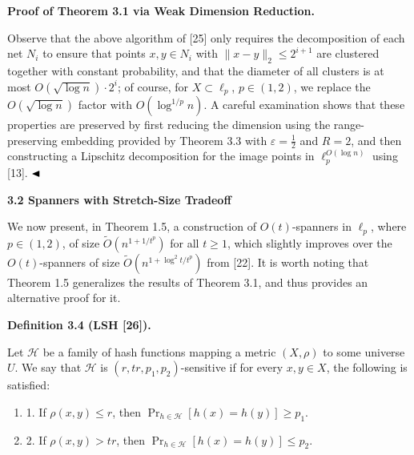 \par
\par
\par
\par
\par\medskip\noindent\textbf{Proof of Theorem 3.1 via Weak Dimension Reduction.}\par
Observe that the above algorithm of [25] only requires the decomposition of each net $N_{i}$ to ensure that points $x,y\in N_{i}$ with $\|x-y\|_{2}\leq 2^{i+1}$ are clustered together with constant probability, and that the diameter of all clusters is at most $O(\sqrt{\log{n}})\cdot 2^{i}$; of course, for $X\subset\ell_{p}$, $p\in(1,2)$, we replace the $O(\sqrt{\log{n}})$ factor with $O(\log^{1/p}{n})$. A careful examination shows that these properties are preserved by first reducing the dimension using the range-preserving embedding provided by Theorem 3.3 with $\varepsilon=\frac{1}{2}$ and $R=2$, and then constructing a Lipschitz decomposition for the image points in $\ell_{p}^{O(\log{n})}$ using [13]. $\hfill\blacktriangleleft$
\par
\par
\par
\par
\par\medskip\noindent\textbf{3.2 Spanners with Stretch-Size Tradeoff}\par
We now present, in Theorem 1.5, a construction of $O(t)$-spanners in $\ell_{p}$, where $p\in(1,2)$, of size $\tilde{O}(n^{1+1/t^{p}})$ for all $t\geq 1$, which slightly improves over the $O(t)$-spanners of size $\tilde{O}(n^{1+\log^{2}{t}/t^{p}})$ from [22]. It is worth noting that Theorem 1.5 generalizes the results of Theorem 3.1, and thus provides an alternative proof for it.
\par
\par
\par\medskip\noindent\textbf{Definition 3.4 (LSH [26]).}\par
Let $\mathcal{H}$ be a family of hash functions mapping a metric $(X,\rho)$ to some universe $U$. We say that $\mathcal{H}$ is $(r,tr,p_{1},p_{2})$-sensitive if for every $x,y\in X$, the following is satisfied:
\par
\begin{enumerate}
\item  1. 
If $\rho(x,y)\leq r$, then $\Pr_{h\in\mathcal{H}}[h(x)=h(y)]\geq p_{1}$.
\par
\par
\item  2. 
If $\rho(x,y)>tr$, then $\Pr_{h\in\mathcal{H}}[h(x)=h(y)]\leq p_{2}$.
\par
\par
\end{enumerate}
